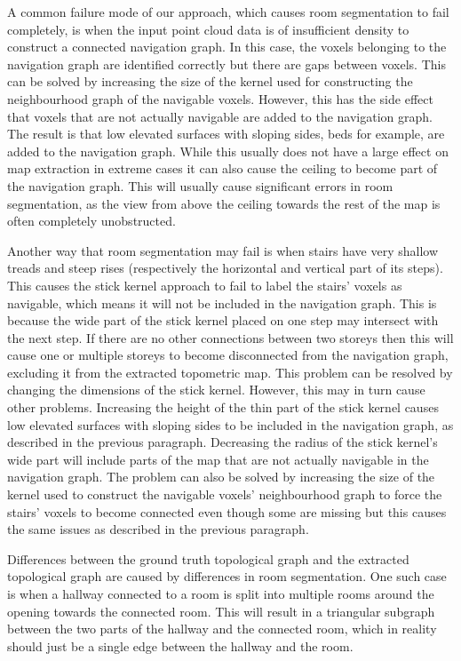 A common failure mode of our approach, which causes room segmentation to fail completely, is when the input point cloud data is of insufficient density to construct a connected navigation graph. In this case, the voxels belonging to the navigation graph are identified correctly but there are gaps between voxels. This can be solved by increasing the size of the kernel used for constructing the neighbourhood graph of the navigable voxels. However, this has the side effect that voxels that are not actually navigable are added to the navigation graph. The result is that low elevated surfaces with sloping sides, beds for example, are added to the navigation graph. While this usually does not have a large effect on map extraction in extreme cases it can also cause the ceiling to become part of the navigation graph. This will usually cause significant errors in room segmentation, as the view from above the ceiling towards the rest of the map is often completely unobstructed.

Another way that room segmentation may fail is when stairs have very shallow treads and steep rises (respectively the horizontal and vertical part of its steps). This causes the stick kernel approach to fail to label the stairs' voxels as navigable, which means it will not be included in the navigation graph. This is because the wide part of the stick kernel placed on one step may intersect with the next step. If there are no other connections between two storeys then this will cause one or multiple storeys to become disconnected from the navigation graph, excluding it from the extracted topometric map. This problem can be resolved by changing the dimensions of the stick kernel. However, this may in turn cause other problems. Increasing the height of the thin part of the stick kernel causes low elevated surfaces with sloping sides to be included in the navigation graph, as described in the previous paragraph. Decreasing the radius of the stick kernel's wide part will include parts of the map that are not actually navigable in the navigation graph. The problem can also be solved by increasing the size of the kernel used to construct the navigable voxels' neighbourhood graph to force the stairs'  voxels to become connected even though some are missing but this causes the same issues as described in the previous paragraph.

Differences between the ground truth topological graph and the extracted topological graph are caused by differences in room segmentation. One such case is when a hallway connected to a room is split into multiple rooms around the opening towards the connected room. This will result in a triangular subgraph between the two parts of the hallway and the connected room, which in reality should just be a single edge between the hallway and the room. 


